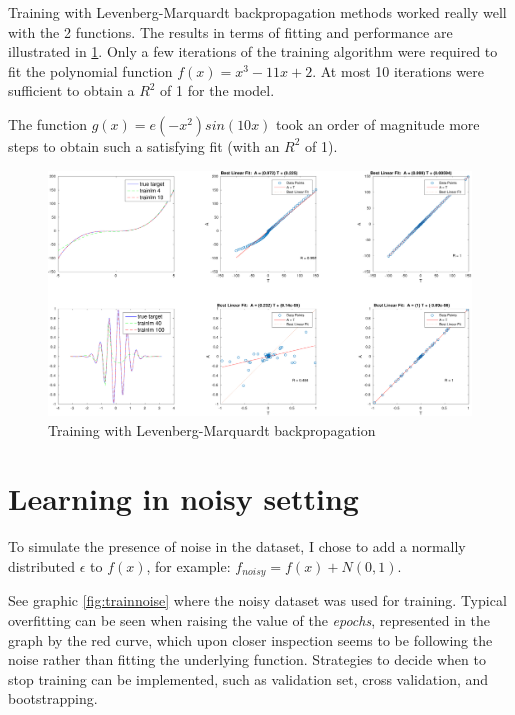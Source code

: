 \documentclass[11pt, a4paper]{article}
\begin{document}
Training with Levenberg-Marquardt backpropagation methods worked
really well with the 2 functions. The results in terms of fitting and
performance are illustrated in \ref{fig:trainll}. Only a few
iterations of the training algorithm were required to fit the
polynomial function $f(x)=x^3-11x+2$. At most 10 iterations were
sufficient to obtain a $R^2$ of 1 for the model.

The function $g(x)=e(-x^2)sin(10x)$ took an order of magnitude more
steps to obtain such a satisfying fit (with an $R^2$ of 1).

\begin{figure}[H]
  \includegraphics[scale=.43]{trainlm.pdf}
  \caption{Training with Levenberg-Marquardt backpropagation}  
  \label{fig:trainll}
\end{figure}

\section{Learning in noisy setting}

To simulate the presence of noise in the dataset, I chose to add a
normally distributed $\epsilon$ to $f(x)$, for example:
$f_{noisy}=f(x)+N(0,1)$. 

See graphic \ref{fig:trainnoise} where the noisy dataset was used for
training. Typical overfitting can be seen when raising the value of
the \emph{epochs}, represented in the graph by the red curve, which
upon closer inspection seems to be following the noise rather than
fitting the underlying function. Strategies to decide when to stop
training can be implemented, such as validation set, cross validation,
and bootstrapping.
\end{document}

